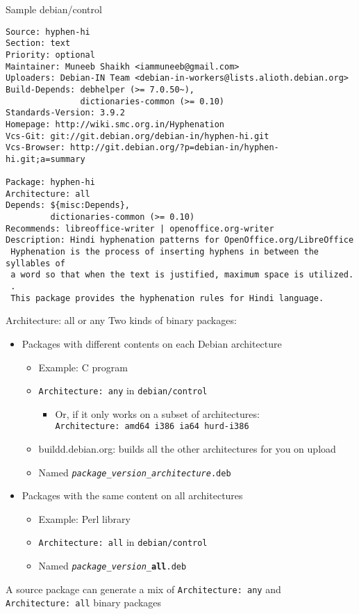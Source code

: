 \documentclass[red,10pt,a4paper]{beamer}
\begin{document}
\begin{frame}[fragile]{Sample debian/control}

\begin{lstlisting}[basicstyle=\fontsize{7pt}{10}\ttfamily]
Source: hyphen-hi
Section: text
Priority: optional
Maintainer: Muneeb Shaikh <iammuneeb@gmail.com>
Uploaders: Debian-IN Team <debian-in-workers@lists.alioth.debian.org>
Build-Depends: debhelper (>= 7.0.50~),
               dictionaries-common (>= 0.10)
Standards-Version: 3.9.2
Homepage: http://wiki.smc.org.in/Hyphenation
Vcs-Git: git://git.debian.org/debian-in/hyphen-hi.git
Vcs-Browser: http://git.debian.org/?p=debian-in/hyphen-hi.git;a=summary

Package: hyphen-hi
Architecture: all
Depends: ${misc:Depends},
         dictionaries-common (>= 0.10)
Recommends: libreoffice-writer | openoffice.org-writer
Description: Hindi hyphenation patterns for OpenOffice.org/LibreOffice
 Hyphenation is the process of inserting hyphens in between the syllables of
 a word so that when the text is justified, maximum space is utilized.
 .
 This package provides the hyphenation rules for Hindi language.

\end{lstlisting}
\end{frame}

\begin{frame}{Architecture: all or any}
  Two kinds of binary packages:
  \hbr
  \begin{itemize}
  \item Packages with different contents on each Debian architecture
    \begin{itemize}
    \item Example: C program
    \item \texttt{Architecture:\ any} in \texttt{debian/control}
      \begin{itemize}
      \item Or, if it only works on a subset of architectures:\\
        \texttt{Architecture:\ amd64 i386 ia64 hurd-i386}
      \end{itemize}
    \item buildd.debian.org: builds all the other architectures for you on upload
    \item Named \texttt{\textsl{package}\_\textsl{version}\_\textsl{architecture}.deb}
    \end{itemize}
    \br
  \item Packages with the same content on all architectures
    \begin{itemize}
    \item Example: Perl library
    \item \texttt{Architecture:\ all} in \texttt{debian/control}
    \item Named \texttt{\textsl{package}\_\textsl{version}\_\textbf{all}.deb}
    \end{itemize}
  \end{itemize}
  \br
  A source package can generate a mix of \texttt{Architecture:\ any} and \texttt{Architecture:\ all} binary packages
\end{frame}
\end{document}
